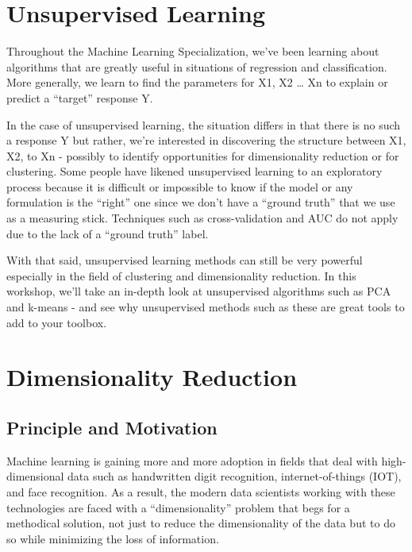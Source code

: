 \documentclass[]{article}
\begin{document}
\hypertarget{unsupervised-learning}{%
\section{Unsupervised Learning}\label{unsupervised-learning}}

Throughout the Machine Learning Specialization, we've been learning
about algorithms that are greatly useful in situations of regression and
classification. More generally, we learn to find the parameters for X1,
X2 \ldots{} Xn to explain or predict a ``target'' response Y.

In the case of unsupervised learning, the situation differs in that
there is no such a response Y but rather, we're interested in
discovering the structure between X1, X2, to Xn - possibly to identify
opportunities for dimensionality reduction or for clustering. Some
people have likened unsupervised learning to an exploratory process
because it is difficult or impossible to know if the model or any
formulation is the ``right'' one since we don't have a ``ground truth''
that we use as a measuring stick. Techniques such as cross-validation
and AUC do not apply due to the lack of a ``ground truth'' label.

With that said, unsupervised learning methods can still be very powerful
especially in the field of clustering and dimensionality reduction. In
this workshop, we'll take an in-depth look at unsupervised algorithms
such as PCA and k-means - and see why unsupervised methods such as these
are great tools to add to your toolbox.

\hypertarget{dimensionality-reduction}{%
\section{Dimensionality Reduction}\label{dimensionality-reduction}}

\hypertarget{principle-and-motivation}{%
\subsection{Principle and Motivation}\label{principle-and-motivation}}

Machine learning is gaining more and more adoption in fields that deal
with high-dimensional data such as handwritten digit recognition,
internet-of-things (IOT), and face recognition. As a result, the modern
data scientists working with these technologies are faced with a
``dimensionality'' problem that begs for a methodical solution, not just
to reduce the dimensionality of the data but to do so while minimizing
the loss of information.
\end{document}
